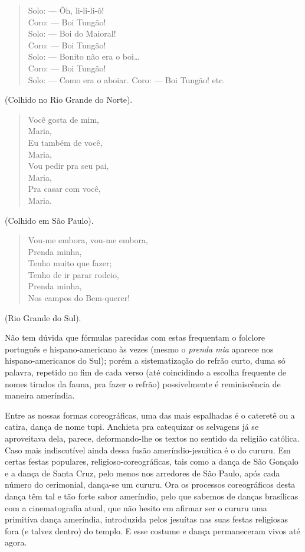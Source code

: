 \begin{verse}
Solo: --- Ôh, li-li-li-ô!\\
Coro: --- Boi Tungão!\\
Solo: --- Boi do Maioral!\\
Coro: --- Boi Tungão!\\
Solo: --- Bonito não era o boi\ldots{}\\
Coro: --- Boi Tungão!\\
Solo: --- Como era o aboiar. Coro: --- Boi Tungão! etc.
\end{verse}

(Colhido no Rio Grande do Norte).

\begin{verse}
Você gosta de mim,\\
Maria,\\
Eu também de você,\\
Maria,\\
Vou pedir pra seu pai,\\
Maria,\\
Pra casar com você,\\
Maria.
\end{verse}

(Colhido em São Paulo).

\begin{verse}
Vou-me embora, vou-me embora,\\
Prenda minha,\\
Tenho muito que fazer;\\
Tenho de ir parar rodeio,\\
Prenda minha,\\
Nos campos do Bem-querer!
\end{verse}

(Rio Grande do Sul).

Não tem dúvida que fórmulas parecidas com estas frequentam o folclore
português e hispano-americano às vezes (mesmo o \textit{prenda mia} aparece
nos hispano-americanos do Sul); porém a sistematização do refrão curto,
duma só palavra, repetido no fim de cada verso (até coincidindo a
escolha frequente de nomes tirados da fauna, pra fazer o refrão)
possivelmente é reminiscência de maneira ameríndia.

Entre as nossas formas coreográficas, uma das mais espalhadas é o
cateretê ou a catira, dança de nome tupi. Anchieta pra catequizar os
selvagens já se aproveitava dela, parece, deformando-lhe os textos no
sentido da religião católica. Caso mais indiscutível ainda dessa fusão
ameríndio-jesuítica é o do cururu. Em certas festas populares,
religioso-coreográficas, tais como a dança de São Gonçalo e a dança de
Santa Cruz, pelo menos nos arredores de São Paulo, após cada número do
cerimonial, dança-se um cururu. Ora os processos coreográficos desta
dança têm tal e tão forte sabor ameríndio, pelo que sabemos de danças
brasílicas com a cinematografia atual, que não hesito em afirmar ser o
cururu uma primitiva dança ameríndia, introduzida pelos jesuítas nas
suas festas religiosas fora (e talvez dentro) do templo. E esse costume
e dança permaneceram vivos até agora.


